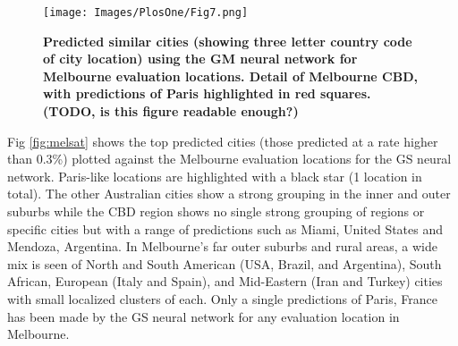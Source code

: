 \documentclass[10pt,letterpaper]{article}
\begin{document}
\begin{figure}[!htbp]
\centering     
\texttt{[image: Images/PlosOne/Fig7.png]} 
\caption{\bf Predicted similar cities (showing three letter country code of city location) using the GM neural network for Melbourne evaluation locations. Detail of Melbourne CBD, with predictions of Paris highlighted in red squares. (TODO, is this figure readable enough?)}    
 \label{fig:melmapscbd}  
\end{figure} 

Fig \ref{fig:melsat} shows the top predicted cities (those predicted at a rate higher than 0.3\%) plotted against the Melbourne evaluation locations for the GS neural network. Paris-like locations are highlighted with a black star (1 location in total).  The other Australian cities show a strong grouping in the inner and outer suburbs while the CBD region shows no single strong grouping of regions or specific cities but with a range of predictions such as Miami, United States and Mendoza, Argentina. In Melbourne's far outer suburbs and rural areas, a wide mix is seen of North and South American (USA, Brazil, and Argentina), South African, European (Italy and Spain), and Mid-Eastern (Iran and Turkey) cities with small localized clusters of each. Only a single predictions of Paris, France has been made by the GS neural network for any evaluation location in Melbourne.
\end{document}
